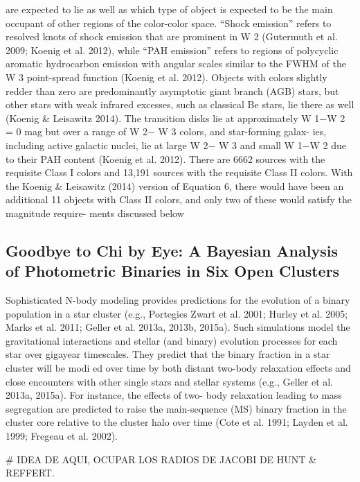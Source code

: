 \documentclass[../Main.tex]{subfiles}
\begin{document}
{are expected to lie as well as which type of object is expected
to be the main occupant of other regions of the color-color
space. “Shock emission” refers to resolved knots of shock
emission that are prominent in W 2 (Gutermuth et al. 2009;
Koenig et al. 2012), while “PAH emission” refers to regions
of polycyclic aromatic hydrocarbon emission with angular
scales similar to the FWHM of the W 3 point-spread function
(Koenig et al. 2012). Objects with colors slightly redder than
zero are predominantly asymptotic giant branch (AGB) stars,
but other stars with weak infrared excesses, such as classical
Be stars, lie there as well (Koenig & Leisawitz 2014). The
transition disks lie at approximately W 1−W 2 = 0 mag but
over a range of W 2− W 3 colors, and star-forming galax-
ies, including active galactic nuclei, lie at large W 2− W 3
and small W 1−W 2 due to their PAH content (Koenig et al.
2012).
There are 6662 sources with the requisite Class I colors
and 13,191 sources with the requisite Class II colors. With
the Koenig & Leisawitz (2014) version of Equation 6, there
would have been an additional 11 objects with Class II colors,
and only two of these would satisfy the magnitude require-
ments discussed below}
\subsection{Goodbye to Chi by Eye: A Bayesian Analysis of Photometric Binaries in Six Open Clusters} 

Sophisticated N-body modeling provides predictions for the
evolution of a binary population in a star cluster (e.g., Portegies
Zwart et al. 2001; Hurley et al. 2005; Marks et al. 2011; Geller
et al. 2013a, 2013b, 2015a). Such simulations model the
gravitational interactions and stellar (and binary) evolution
processes for each star over gigayear timescales. They predict
that the binary fraction in a star cluster will be modi ed over
time by both distant two-body relaxation effects and close
encounters with other single stars and stellar systems (e.g.,
Geller et al. 2013a, 2015a). For instance, the effects of two-
body relaxation leading to mass segregation are predicted to
raise the main-sequence (MS) binary fraction in the cluster core relative to the cluster halo over time (Cote et al. 1991; Layden
et al. 1999; Fregeau et al. 2002). 


# IDEA DE AQUI, OCUPAR LOS RADIOS DE JACOBI DE HUNT & REFFERT.
\end{document}
